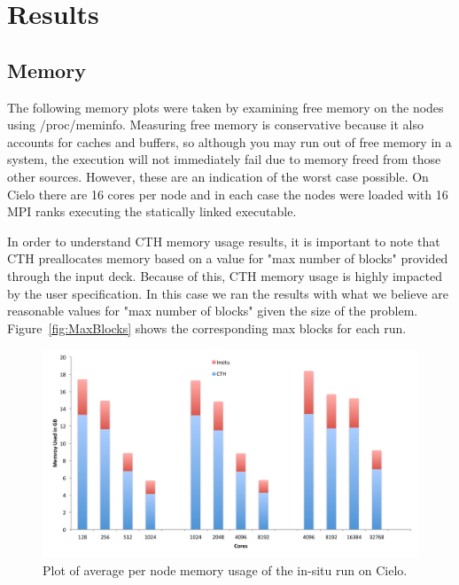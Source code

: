 \section{Results}
\label{sec:Results}


\subsection{Memory}
The following memory plots were taken by examining free memory on the nodes
using /proc/meminfo.  Measuring free memory is conservative because it also
accounts for caches and buffers, so although you may run out of free memory in
a system, the execution will not immediately fail due to memory freed from
those other sources.  However, these are an indication of the worst case
possible.  On Cielo there are 16 cores per node and in each case the nodes were
 loaded with 16 MPI ranks executing the statically linked executable.  

In order to understand CTH memory usage results, it is important to note that
CTH preallocates memory based on a value for "max number of blocks" provided
through the input deck.  Because of this, CTH memory usage is highly impacted
by the user specification.  In this case we ran the results with what we
believe are reasonable values for "max number of blocks" given the size of the
problem.  Figure~\ref{fig:MaxBlocks} shows the corresponding max blocks for
each run.

\begin{figure}[htb]
  \centering
  \includegraphics[width=\linewidth]{figures/MemoryUsageInSituPerNode.pdf}
  \caption{Plot of average per node memory usage of the in-situ run on Cielo.}
  \label{fig:MemoryInSituPerNode}
\end{figure}

